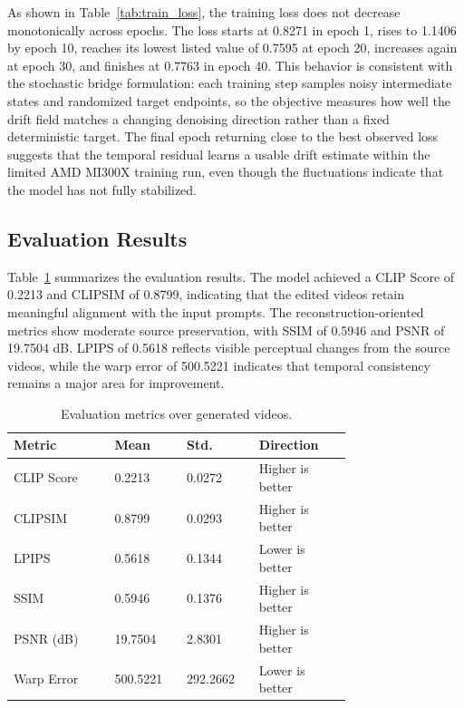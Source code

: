 \documentclass[journal]{IEEEtran}
\begin{document}
As shown in Table~\ref{tab:train_loss}, the training loss does not decrease monotonically across epochs. The loss starts at 0.8271 in epoch 1, rises to 1.1406 by epoch 10, reaches its lowest listed value of 0.7595 at epoch 20, increases again at epoch 30, and finishes at 0.7763 in epoch 40. This behavior is consistent with the stochastic bridge formulation: each training step samples noisy intermediate states and randomized target endpoints, so the objective measures how well the drift field matches a changing denoising direction rather than a fixed deterministic target. The final epoch returning close to the best observed loss suggests that the temporal residual learns a usable drift estimate within the limited AMD MI300X training run, even though the fluctuations indicate that the model has not fully stabilized.

\subsection{Evaluation Results}
Table~\ref{tab:eval_metrics} summarizes the evaluation results. The model achieved a CLIP Score of 0.2213 and CLIPSIM of 0.8799, indicating that the edited videos retain meaningful alignment with the input prompts. The reconstruction-oriented metrics show moderate source preservation, with SSIM of 0.5946 and PSNR of 19.7504 dB. LPIPS of 0.5618 reflects visible perceptual changes from the source videos, while the warp error of 500.5221 indicates that temporal consistency remains a major area for improvement.

\begin{table}[t]
\caption{Evaluation metrics over generated videos.}
\label{tab:eval_metrics}
\centering
\footnotesize
\begin{tabular}{@{}p{0.24\linewidth}p{0.14\linewidth}p{0.14\linewidth}p{0.22\linewidth}@{}}
\toprule
\textbf{Metric} & \textbf{Mean} & \textbf{Std.} & \textbf{Direction} \\
\midrule
CLIP Score & 0.2213 & 0.0272 & Higher is better \\
CLIPSIM & 0.8799 & 0.0293 & Higher is better \\
LPIPS & 0.5618 & 0.1344 & Lower is better \\
SSIM & 0.5946 & 0.1376 & Higher is better \\
PSNR (dB) & 19.7504 & 2.8301 & Higher is better \\
Warp Error & 500.5221 & 292.2662 & Lower is better \\
\bottomrule
\end{tabular}
\end{table}
\end{document}
